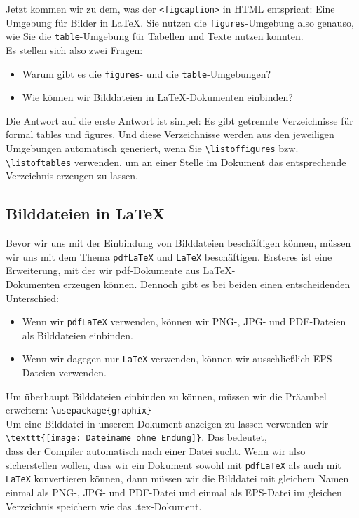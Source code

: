 Jetzt kommen wir zu dem, was der \verb|<figcaption>| in HTML entspricht: Eine Umgebung für Bilder in LaTeX. Sie nutzen die \verb|figures|-Umgebung also genauso, wie Sie die \verb|table|-Umgebung für Tabellen und Texte nutzen konnten.\\

Es stellen sich also zwei Fragen:

\begin{itemize}
	\item Warum gibt es die \verb|figures|- und die \verb|table|-Umgebungen?
	\item Wie können wir Bilddateien in LaTeX-Dokumenten einbinden?
\end{itemize}

Die Antwort auf die erste Antwort ist simpel: Es gibt getrennte Verzeichnisse für formal tables und figures. Und diese Verzeichnisse werden aus den jeweiligen Umgebungen automatisch generiert, wenn Sie \verb|\listoffigures| bzw. \verb|\listoftables| verwenden, um an einer Stelle im Dokument das entsprechende Verzeichnis erzeugen zu lassen.

\subsection{Bilddateien in LaTeX}

Bevor wir uns mit der Einbindung von Bilddateien beschäftigen können, müssen wir uns mit dem Thema \verb|pdfLaTeX| und \verb|LaTeX| beschäftigen. Ersteres ist eine Erweiterung, mit der wir pdf-Dokumente aus LaTeX-\\Dokumenten erzeugen können. Dennoch gibt es bei beiden einen entscheidenden Unterschied:

\begin{itemize}
	\item Wenn wir \verb|pdfLaTeX| verwenden, können wir PNG-, JPG- und PDF-Dateien als Bilddateien einbinden.
	\item Wenn wir dagegen \glqq{}nur\grqq{} \verb|LaTeX| verwenden, können wir ausschließlich EPS-Dateien verwenden.
\end{itemize}

Um überhaupt Bilddateien einbinden zu können, müssen wir die Präambel erweitern: \verb|\usepackage{graphix}|\\

Um eine Bilddatei in unserem Dokument anzeigen zu lassen verwenden wir \verb|\texttt{[image: Dateiname ohne Endung]}|. Das bedeutet, \\dass der Compiler automatisch nach einer Datei sucht. Wenn wir also sicherstellen wollen, dass wir ein Dokument sowohl mit \verb|pdfLaTeX| als auch mit \verb|LaTeX| konvertieren können, dann müssen wir die Bilddatei mit gleichem Namen einmal als PNG-, JPG- und PDF-Datei und einmal als EPS-Datei im gleichen Verzeichnis speichern wie das .tex-Dokument.\\

